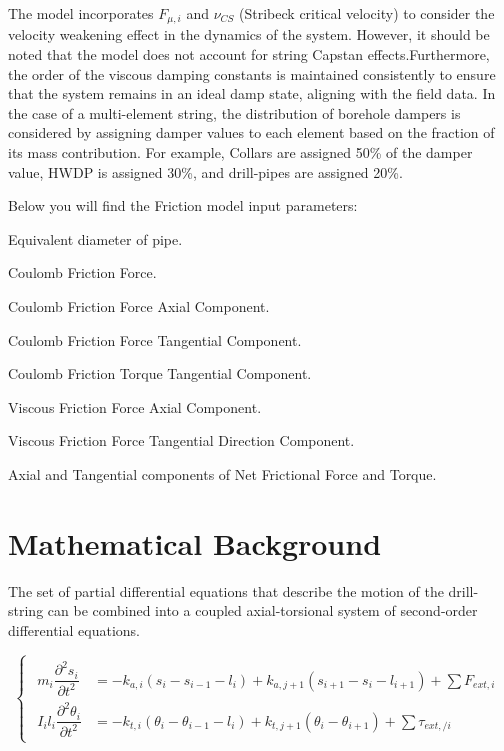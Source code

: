 The model incorporates $F_{\mu,i}$ and $\nu_{CS}$ (Stribeck critical velocity) to consider the velocity weakening effect in the dynamics of the system. However, it should be noted that the model does not account for string Capstan effects.Furthermore, the order of the viscous damping constants is maintained consistently to ensure that the system remains in an ideal damp state, aligning with the field data. In the case of a multi-element string, the distribution of borehole dampers is considered by assigning damper values to each element based on the fraction of its mass contribution. For example, Collars are assigned 50\% of the damper value, HWDP is assigned 30\%, and drill-pipes are assigned 20\%. 

Below you will find the Friction model input parameters:
\begin{bulletedlist}
    \item Equivalent diameter of pipe.
    \item Coulomb Friction Force.
    \item Coulomb Friction Force Axial Component.
    \item Coulomb Friction Force Tangential Component.
    \item Coulomb Friction Torque Tangential Component.
    \item Viscous Friction Force Axial Component.
    \item Viscous Friction Force Tangential Direction Component.
    \item Axial and Tangential components of Net Frictional Force and Torque.
\end{bulletedlist}

\section{Mathematical Background}

The set of partial differential equations that describe the motion of the drill-string can be combined into a coupled axial-torsional system of second-order differential equations. 

\begin{equation}\label{Governing equations}
  \begin{cases}
   \begin{aligned}
     m_{i}\dfrac{\partial^{2}s_{i}}{\partial t^{2}} & = -k_{a,i}(s_{i}-s_{i-1}-l_{i}) + k_{a,j+1}(s_{i+1}-s_{i}-l_{i+1}) + \sum{F_{ext, i}} \\
     I_{i}l_{i}\dfrac{\partial^{2}\theta_{i}}{\partial t^{2}} & = -k_{t,i}(\theta_{i}-\theta_{i-1}-l_{i}) + k_{t,j+1}(\theta_{i}-\theta_{i+1}) + \sum{\tau_{ext,/ i}}
   \end{aligned}
  \end{cases}
\end{equation}

